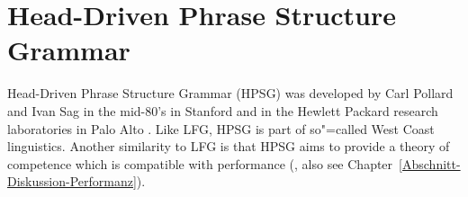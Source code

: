 
\chapter{Head-Driven Phrase Structure Grammar}
\label{Kapitel-HPSG}
\label{chap-HPSG}

Head-Driven Phrase Structure Grammar (HPSG) was developed by Carl Pollard and
Ivan Sag in the mid-80's in Stanford and in the Hewlett Packard research laboratories in Palo Alto
\citep{ps,ps2}. Like LFG, HPSG is part of so"=called West Coast linguistics. Another similarity to
LFG is that HPSG aims to provide a theory of competence which is compatible with performance
(, also see Chapter~\ref{Abschnitt-Diskussion-Performanz}).  

